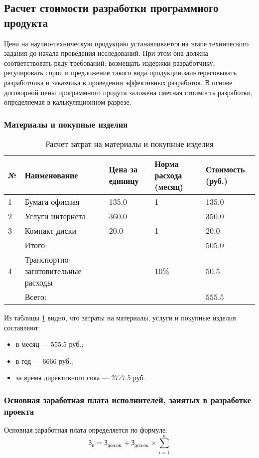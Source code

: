 \subsection{Расчет  стоимости  разработки программного продукта}
Цена на научно-техническую продукцию устанавливается на этапе технического задания
до начала проведения исследований.
При  этом она должна соответствовать ряду требований: возмещать  издержки разработчику,
регулировать спрос и предложение такого вида продукции,заинтересовывать
разработчика и заказчика в проведении эффективных разработок. В основе
договорной цены программного продута заложена  сметная  стоимость 
разработки, определяемая в калькуляционном разрезе.

\subsubsection{Материалы и покупные изделия}
\begin{table}
\caption{Расчет затрат на материалы и покупные изделия}
\begin{tabular}{|p{1cm}|p{4cm}|p{3cm}|p{3cm}|p{4cm}|}
\hline{}
№ & Наименование & Цена за единицу& Норма расхода (месяц) & Стоимость (руб.) \\
\hline{}
1 & Бумага офисная & 135.0 & 1 & 135.0 \\
\hline{}
2 & Услуги интернета & 360.0 & --- & 350.0 \\
\hline{}
3 & Компакт диски & 20.0 & 1 & 20.0 \\
\hline{}
   & Итого:              &          &    & 505.0 \\
\hline{}
4 & Транспортно-заготовительные расходы & & 10\%  & 50.5 \\
\hline{}
  & Всего: & & &  555.5 \\
\hline
\end{tabular}
\label{table:meterials}
\end{table}
Из таблицы \ref{table:meterials} видно, что затраты на материалы, услуги и покупные изделия составляют:
\begin{itemize}
    \item{} в месяц --- 555.5 руб.;
    \item{} в год --- 6666 руб.;
    \item{} за время директивного сока --- 2777.5 руб.
\end{itemize}


\subsubsection{Основная заработная плата исполнителей, занятых в разработке проекта}
Основная заработная плата определяется по формуле:
\begin{equation}
	\textrm{З}_{\textrm{п}} = \textrm{З}_{\textrm{дол.ок.}} + \textrm{З}_{\textrm{дол.ок.}} \times{} \sum_{i=1}^n
\end{equation}

